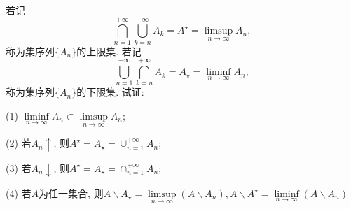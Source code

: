 \begin{yyEx}
	若记\begin{equation}
	\bigcap_{n=1}^{+\infty}\bigcup_{k=n}^{+\infty}A_k = A^{\star} = \limsup_{n\to\infty}A_n,
	\end{equation}
	称为集序列$\{A_n\}$的上限集. 若记
	\begin{equation}
	\bigcup_{n=1}^{+\infty}\bigcap_{k=n}^{+\infty}A_k = A_{\star} = \liminf_{n\to\infty}A_n,
	\end{equation}
	称为集序列$\{A_n\}$的下限集. 试证:
	\begin{blist}
		\item[(1)] $\liminf\limits_{n\to\infty}A_n\subset \limsup\limits_{n\to\infty}A_n$;
		\item[(2)] 若$A_n\uparrow$, 则$A^\star = A_\star = \cup_{n=1}^{+\infty}A_n$;
		\item[(3)] 若$A_n\downarrow$, 则$A^\star = A_\star = \cap_{n=1}^{+\infty}A_n$;
		\item[(4)] 若$A$为任一集合, 则$A\backslash A_\star = \limsup\limits_{n\to\infty}(A\backslash A_n),A\backslash A^\star = \liminf\limits_{n\to\infty}(A\backslash A_n)$
	\end{blist}
	
\end{yyEx}

